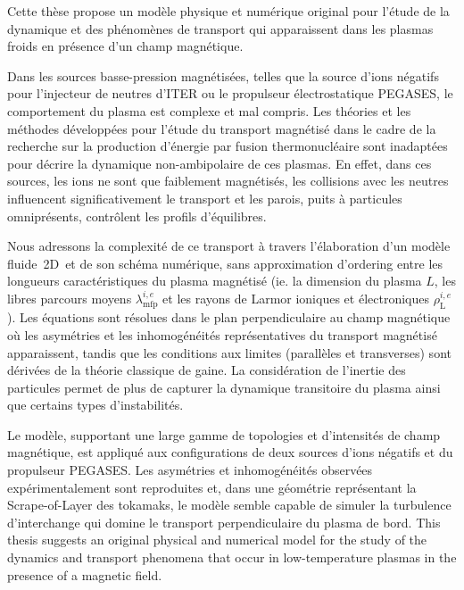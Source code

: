 \thispagestyle{preface}
Cette thèse propose un modèle physique et numérique original pour l'étude de la
dynamique et des phénomènes de transport qui apparaissent dans les plasmas
froids en présence d'un champ magnétique.
		
Dans les sources basse-pression magnétisées, telles que la source d'ions
négatifs pour l'injecteur de neutres d'ITER ou le propulseur électrostatique
PEGASES, le comportement du plasma est complexe et mal compris.
Les théories et les méthodes développées pour l'étude du transport magnétisé
dans le cadre de la recherche sur la production d'énergie par fusion
thermonucléaire sont inadaptées pour décrire la dynamique non-ambipolaire de ces
plasmas. En effet, dans ces sources, les ions ne sont que faiblement magnétisés,
les collisions avec les neutres influencent significativement le transport et
les parois, puits à particules omniprésents, contrôlent les profils
d'équilibres.
		
Nous adressons la complexité de ce transport à travers l’élaboration d'un modèle
fluide~2D\textonehalf ~et de son schéma numérique, sans approximation d'ordering
entre les longueurs caractéristiques du plasma magnétisé (ie. la dimension du
plasma $L$, les libres parcours moyens $\lambda_\text{mfp}^{i,e}$ et les rayons
de Larmor ioniques et électroniques $\rho_\text{L}^{i,e}$).
Les équations sont résolues dans le plan perpendiculaire au champ magnétique où
les asymétries et les inhomogénéités représentatives du transport magnétisé
apparaissent, tandis que les conditions aux limites (parallèles et transverses)
sont dérivées de la théorie classique de gaine. La considération de l'inertie
des particules permet de plus de capturer la dynamique transitoire du plasma
ainsi que certains types d'instabilités.
		
Le modèle, supportant une large gamme de topologies et d'intensités de champ
magnétique, est appliqué aux configurations de deux sources d'ions négatifs et
du propulseur PEGASES. Les asymétries et inhomogénéités observées
expérimentalement sont reproduites et, dans une géométrie représentant la
Scrape-of-Layer des tokamaks, le modèle semble capable de simuler la turbulence
d'interchange qui domine le transport perpendiculaire du plasma de bord.
\newpage
		\thispagestyle{empty}
\cleardoublepage
		\thispagestyle{preface}	
This thesis suggests an original physical and numerical model for the study of
the dynamics and transport phenomena that occur in low-temperature plasmas in
the presence of a magnetic field.

